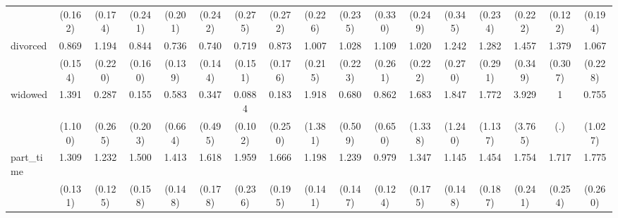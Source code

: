 {\begin{tabular}{l*{16}{c}}
                    &     (0.162)         &     (0.174)         &     (0.241)         &     (0.201)         &     (0.242)         &     (0.275)         &     (0.272)         &     (0.226)         &     (0.235)         &     (0.330)         &     (0.249)         &     (0.345)         &     (0.234)         &     (0.222)         &     (0.122)         &     (0.194)         \\
[1em]
divorced            &       0.869         &       1.194         &       0.844         &       0.736         &       0.740         &       0.719         &       0.873         &       1.007         &       1.028         &       1.109         &       1.020         &       1.242         &       1.282         &       1.457         &       1.379         &       1.067         \\
                    &     (0.154)         &     (0.220)         &     (0.160)         &     (0.139)         &     (0.144)         &     (0.151)         &     (0.176)         &     (0.215)         &     (0.223)         &     (0.261)         &     (0.222)         &     (0.270)         &     (0.291)         &     (0.349)         &     (0.307)         &     (0.228)         \\
[1em]
widowed             &       1.391         &       0.287         &       0.155         &       0.583         &       0.347         &      0.0884\sym{*}  &       0.183         &       1.918         &       0.680         &       0.862         &       1.683         &       1.847         &       1.772         &       3.929         &           1         &       0.755         \\
                    &     (1.100)         &     (0.265)         &     (0.203)         &     (0.664)         &     (0.495)         &     (0.102)         &     (0.250)         &     (1.381)         &     (0.509)         &     (0.650)         &     (1.338)         &     (1.240)         &     (1.137)         &     (3.765)         &         (.)         &     (1.027)         \\
[1em]
part\_time           &       1.309\sym{**} &       1.232\sym{*}  &       1.500\sym{***}&       1.413\sym{***}&       1.618\sym{***}&       1.959\sym{***}&       1.666\sym{***}&       1.198         &       1.239         &       0.979         &       1.347\sym{*}  &       1.145         &       1.454\sym{**} &       1.754\sym{***}&       1.717\sym{***}&       1.775\sym{***}\\
                    &     (0.131)         &     (0.125)         &     (0.158)         &     (0.148)         &     (0.178)         &     (0.236)         &     (0.195)         &     (0.141)         &     (0.147)         &     (0.124)         &     (0.175)         &     (0.148)         &     (0.187)         &     (0.241)         &     (0.254)         &     (0.260)         \\

\end{tabular}}
